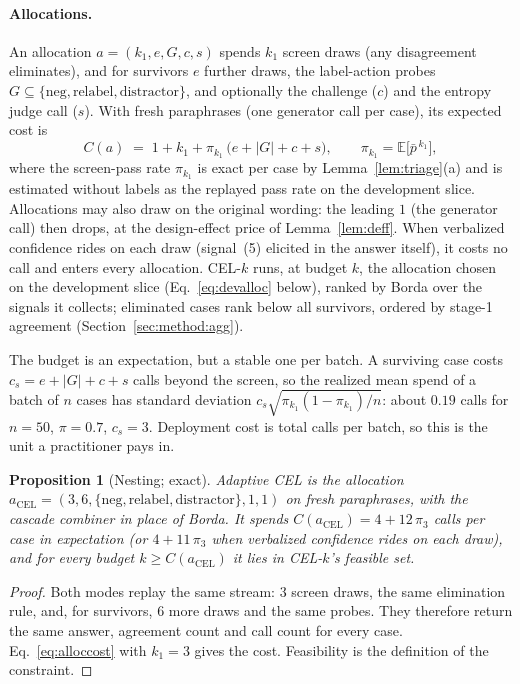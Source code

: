 \documentclass[11pt]{article}
\newtheorem{proposition}{Proposition}
\newcommand{\pbar}{\bar{p}}
\newcommand{\E}{\mathbb{E}}
\begin{document}
\paragraph{Allocations.} An allocation
$a = (k_1, e, G, c, s)$ spends $k_1$ screen draws (any disagreement
eliminates), and for survivors $e$ further draws, the label-action
probes $G \subseteq \{\text{neg}, \text{relabel}, \text{distractor}\}$,
and optionally the challenge ($c$) and the entropy judge call ($s$).
With fresh paraphrases (one generator call per case), its expected
cost is
\begin{equation}
  C(a) \;=\; 1 + k_1 + \pi_{k_1}\,\big(e + |G| + c + s\big),
  \qquad \pi_{k_1} = \E\big[\pbar^{\,k_1}\big],
  \label{eq:alloccost}
\end{equation}
where the screen-pass rate $\pi_{k_1}$ is exact per case by
Lemma~\ref{lem:triage}(a) and is estimated without labels as the
replayed pass rate on the development slice. Allocations may also draw
on the original wording: the leading $1$ (the generator call) then
drops, at the design-effect price of Lemma~\ref{lem:deff}. When
verbalized confidence rides on each draw (signal~(5) elicited in the
answer itself), it costs no call and enters every allocation. CEL-$k$
runs, at budget $k$, the allocation chosen on the development slice
(Eq.~\eqref{eq:devalloc} below), ranked by Borda over the signals it
collects; eliminated cases rank below all survivors, ordered by
stage-1 agreement (Section~\ref{sec:method:agg}).

The budget is an expectation, but a stable one per batch. A surviving
case costs $c_s = e + |G| + c + s$ calls beyond the screen, so the
realized mean spend of a batch of $n$ cases has standard deviation
$c_s \sqrt{\pi_{k_1}(1 - \pi_{k_1}) / n}$: about $0.19$ calls for
$n = 50$, $\pi = 0.7$, $c_s = 3$. Deployment cost is total calls per
batch, so this is the unit a practitioner pays in.

\begin{proposition}[Nesting; exact]
\label{prop:nesting}
Adaptive CEL is the allocation
$a_{\mathrm{CEL}} = (3, 6, \{\text{neg}, \text{relabel},
\text{distractor}\}, 1, 1)$ on fresh paraphrases, with the cascade
combiner in place of Borda. It spends
$C(a_{\mathrm{CEL}}) = 4 + 12\,\pi_3$ calls per case in expectation (or
$4 + 11\,\pi_3$ when verbalized confidence rides on each draw), and for
every budget $k \ge C(a_{\mathrm{CEL}})$ it lies in CEL-$k$'s feasible
set.
\end{proposition}

\begin{proof}
Both modes replay the same stream: $3$ screen draws, the same
elimination rule, and, for survivors, $6$ more draws and the same
probes. They therefore return the same answer, agreement count and
call count for every case. Eq.~\eqref{eq:alloccost} with $k_1 = 3$
gives the cost. Feasibility is the definition of the constraint.
\end{proof}
\end{document}
